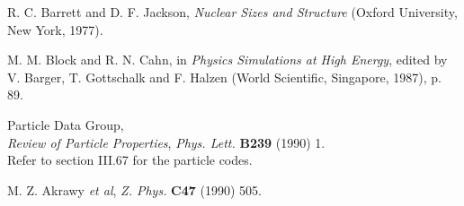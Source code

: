 \begin{thebibliography}{99}
 R. C. Barrett and D. F. Jackson, 
   {\it Nuclear Sizes and Structure} (Oxford University, New York, 1977).

 M. M. Block and R. N. Cahn, 
   in {\it Physics Simulations at High Energy}, edited by V. Barger, 
   T. Gottschalk and F. Halzen (World Scientific, Singapore, 1987), p. 89.

 Particle Data Group,\\  
   {\it Review of Particle Properties}, 
   {\it Phys. Lett.} {\bf B239} (1990) 1. \\
   Refer to section III.67 for the particle codes.

 M. Z. Akrawy {\it et al}, 
   {\it Z. Phys.} {\bf C47} (1990) 505.
     

\end{thebibliography}



